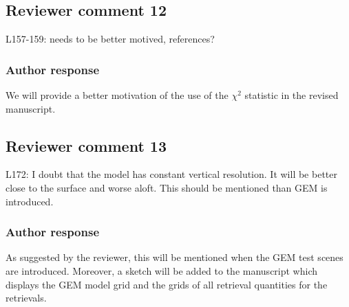 \documentclass[11pt]{scrartcl}
\begin{document}
\subsection*{Reviewer comment 12}
L157-159: needs to be better motived, references?

\subsubsection*{Author response}

We will provide a better motivation of the use of the $\chi^2$ statistic
in the revised manuscript.


%


\subsection*{Reviewer comment 13}
L172: I doubt that the model has constant vertical resolution.  It will be better close to the surface and worse aloft. This should be mentioned than GEM is introduced.

\subsubsection*{Author response}

As suggested by the reviewer, this will be mentioned when the GEM test scenes are
introduced. Moreover, a sketch will be added to the manuscript which displays the
GEM model grid and the grids of all retrieval quantities for the retrievals.
\end{document}

